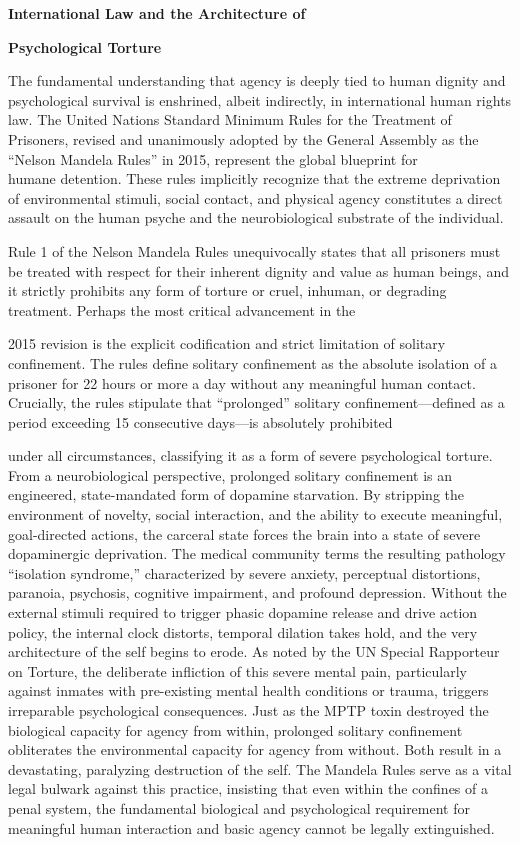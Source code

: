 \textbf{International Law and the Architecture of}

\textbf{Psychological Torture}

The fundamental understanding that agency is deeply tied to human dignity and psychological survival is enshrined, albeit indirectly, in international human rights law. The United Nations Standard Minimum Rules for the Treatment of Prisoners, revised and unanimously adopted by the General Assembly as the ``Nelson Mandela Rules'' in 2015, represent the global blueprint for\\
humane detention. These rules implicitly recognize that the extreme deprivation of environmental stimuli, social contact, and physical agency constitutes a direct assault on the human psyche and the neurobiological substrate of the individual.

Rule 1 of the Nelson Mandela Rules unequivocally states that all prisoners must be treated with respect for their inherent dignity and value as human beings, and it strictly prohibits any form of torture or cruel, inhuman, or degrading treatment. Perhaps the most critical advancement in the

2015 revision is the explicit codification and strict limitation of solitary confinement. The rules define solitary confinement as the absolute isolation of a prisoner for 22 hours or more a day without any meaningful human contact. Crucially, the rules stipulate that ``prolonged'' solitary confinement---defined as a period exceeding 15 consecutive days---is absolutely prohibited

under all circumstances, classifying it as a form of severe psychological torture. From a neurobiological perspective, prolonged solitary confinement is an engineered, state-mandated form of dopamine starvation. By stripping the environment of novelty, social interaction, and the ability to execute meaningful, goal-directed actions, the carceral state forces the brain into a state of severe dopaminergic deprivation. The medical community terms the resulting pathology ``isolation syndrome,'' characterized by severe anxiety, perceptual distortions, paranoia, psychosis, cognitive impairment, and profound depression. Without the external stimuli required to trigger phasic dopamine release and drive action policy, the internal clock distorts, temporal dilation takes hold, and the very architecture of the self begins to erode. As noted by the UN Special Rapporteur on Torture, the deliberate infliction of this severe mental pain, particularly against inmates with pre-existing mental health conditions or trauma, triggers irreparable psychological consequences. Just as the MPTP toxin destroyed the biological capacity for agency from within, prolonged solitary confinement obliterates the environmental capacity for agency from without. Both result in a devastating, paralyzing destruction of the self. The Mandela Rules serve as a vital legal bulwark against this practice, insisting that even within the confines of a penal system, the fundamental biological and psychological requirement for meaningful human interaction and basic agency cannot be legally extinguished.


